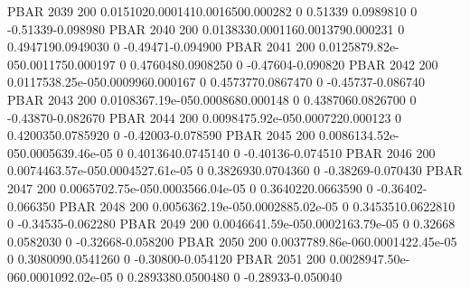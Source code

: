 PBAR    2039    200     0.0151020.0001410.0016500.000282
        0       0.51339 0.0989810       0       -0.51339-0.098980       
PBAR    2040    200     0.0138330.0001160.0013790.000231
        0       0.4947190.0949030       0       -0.49471-0.094900       
PBAR    2041    200     0.0125879.82e-050.0011750.000197
        0       0.4760480.0908250       0       -0.47604-0.090820       
PBAR    2042    200     0.0117538.25e-050.0009960.000167
        0       0.4573770.0867470       0       -0.45737-0.086740       
PBAR    2043    200     0.0108367.19e-050.0008680.000148
        0       0.4387060.0826700       0       -0.43870-0.082670       
PBAR    2044    200     0.0098475.92e-050.0007220.000123
        0       0.4200350.0785920       0       -0.42003-0.078590       
PBAR    2045    200     0.0086134.52e-050.0005639.46e-05
        0       0.4013640.0745140       0       -0.40136-0.074510       
PBAR    2046    200     0.0074463.57e-050.0004527.61e-05
        0       0.3826930.0704360       0       -0.38269-0.070430       
PBAR    2047    200     0.0065702.75e-050.0003566.04e-05
        0       0.3640220.0663590       0       -0.36402-0.066350       
PBAR    2048    200     0.0056362.19e-050.0002885.02e-05
        0       0.3453510.0622810       0       -0.34535-0.062280       
PBAR    2049    200     0.0046641.59e-050.0002163.79e-05
        0       0.32668 0.0582030       0       -0.32668-0.058200       
PBAR    2050    200     0.0037789.86e-060.0001422.45e-05
        0       0.3080090.0541260       0       -0.30800-0.054120       
PBAR    2051    200     0.0028947.50e-060.0001092.02e-05       
        0       0.2893380.0500480       0       -0.28933-0.050040       

